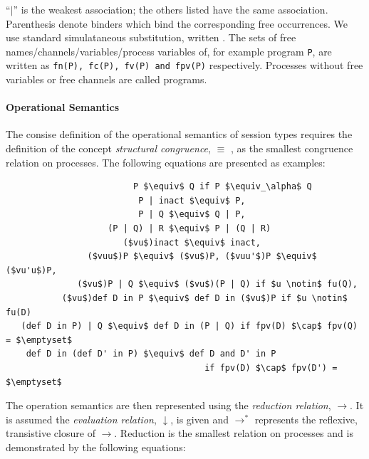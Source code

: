 \documentclass[11pt]{scrartcl}
\begin{document}
``$|$'' is the weakest association; the others listed have the same association. 
Parenthesis denote binders which bind the corresponding free occurrences. We use standard simulataneous substitution, written $ $. The sets of free names/channels/variables/process variables of, for example program \texttt{P}, are written as \texttt{fn(P), fc(P), fv(P) and fpv(P)} respectively. Processes without free variables or free channels are called programs.

\paragraph{Operational Semantics}
The consise definition of the operational semantics of session types requires the 
definition of the concept \emph{structural congruence}, $\equiv$ \cite{BB92, M92},
as the smallest congruence relation on processes. The following equations are
presented as examples:
\\

\begin{lstlisting}
                         P $\equiv$ Q if P $\equiv_\alpha$ Q
                          P | inact $\equiv$ P, 
                          P | Q $\equiv$ Q | P, 
                    (P | Q) | R $\equiv$ P | (Q | R)
                       ($vu$)inact $\equiv$ inact, 
                ($vuu$)P $\equiv$ ($vu$)P, ($vuu'$)P $\equiv$ ($vu'u$)P, 
              ($vu$)P | Q $\equiv$ ($vu$)(P | Q) if $u \notin$ fu(Q), 
           ($vu$)def D in P $\equiv$ def D in ($vu$)P if $u \notin$ fu(D)
   (def D in P) | Q $\equiv$ def D in (P | Q) if fpv(D) $\cap$ fpv(Q) = $\emptyset$
    def D in (def D' in P) $\equiv$ def D and D' in P 
                                       if fpv(D) $\cap$ fpv(D') = $\emptyset$
\end{lstlisting} 

The operation semantics are then represented using the \emph{reduction relation}, 
$\rightarrow$. It is assumed the \emph{evaluation relation}, $\downarrow$, 
is given and $\rightarrow^*$ represents the reflexive, transistive closure of 
$\rightarrow$. Reduction is the smallest relation on processes and is demonstrated 
by the following equations:
\\
\end{document}
